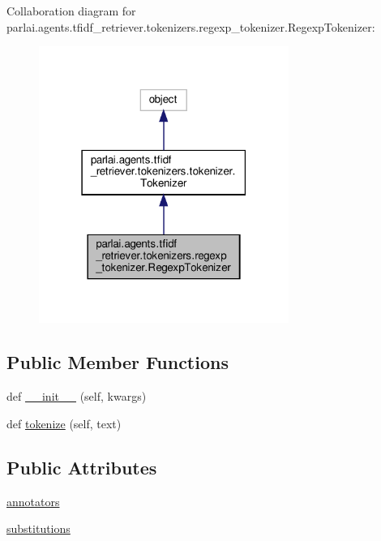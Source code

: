 Collaboration diagram for parlai.\+agents.\+tfidf\+\_\+retriever.\+tokenizers.\+regexp\+\_\+tokenizer.\+Regexp\+Tokenizer\+:
\nopagebreak
\begin{figure}[H]
\begin{center}
\leavevmode
\includegraphics[width=231pt]{d1/d9f/classparlai_1_1agents_1_1tfidf__retriever_1_1tokenizers_1_1regexp__tokenizer_1_1RegexpTokenizer__coll__graph}
\end{center}
\end{figure}
\subsection*{Public Member Functions}
\begin{DoxyCompactItemize}
\item 
def \hyperlink{classparlai_1_1agents_1_1tfidf__retriever_1_1tokenizers_1_1regexp__tokenizer_1_1RegexpTokenizer_af18fd6e3cb635cf6a05f32b90fb51fcc}{\+\_\+\+\_\+init\+\_\+\+\_\+} (self, kwargs)
\item 
def \hyperlink{classparlai_1_1agents_1_1tfidf__retriever_1_1tokenizers_1_1regexp__tokenizer_1_1RegexpTokenizer_aed53e2811a6c13818061b300311fde1a}{tokenize} (self, text)
\end{DoxyCompactItemize}
\subsection*{Public Attributes}
\begin{DoxyCompactItemize}
\item 
\hyperlink{classparlai_1_1agents_1_1tfidf__retriever_1_1tokenizers_1_1regexp__tokenizer_1_1RegexpTokenizer_ae51dae33c902220b106a5537c07f02bc}{annotators}
\item 
\hyperlink{classparlai_1_1agents_1_1tfidf__retriever_1_1tokenizers_1_1regexp__tokenizer_1_1RegexpTokenizer_a59668153f48d9c70ab5b07f2f9a79d7f}{substitutions}
\end{DoxyCompactItemize}
